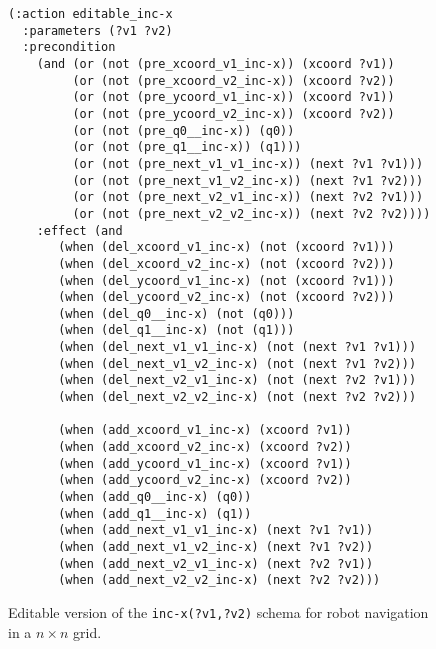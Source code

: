 \documentclass[letterpaper]{article} %
\begin{document}
\begin{figure}
  \begin{tiny}  
  \begin{verbatim}
(:action editable_inc-x
  :parameters (?v1 ?v2)
  :precondition
    (and (or (not (pre_xcoord_v1_inc-x)) (xcoord ?v1))
         (or (not (pre_xcoord_v2_inc-x)) (xcoord ?v2))
         (or (not (pre_ycoord_v1_inc-x)) (xcoord ?v1))                       
         (or (not (pre_ycoord_v2_inc-x)) (xcoord ?v2))
         (or (not (pre_q0__inc-x)) (q0))
         (or (not (pre_q1__inc-x)) (q1)))
         (or (not (pre_next_v1_v1_inc-x)) (next ?v1 ?v1)))
         (or (not (pre_next_v1_v2_inc-x)) (next ?v1 ?v2)))
         (or (not (pre_next_v2_v1_inc-x)) (next ?v2 ?v1)))
         (or (not (pre_next_v2_v2_inc-x)) (next ?v2 ?v2))))
    :effect (and
       (when (del_xcoord_v1_inc-x) (not (xcoord ?v1)))
       (when (del_xcoord_v2_inc-x) (not (xcoord ?v2)))
       (when (del_ycoord_v1_inc-x) (not (xcoord ?v1)))
       (when (del_ycoord_v2_inc-x) (not (xcoord ?v2)))
       (when (del_q0__inc-x) (not (q0)))
       (when (del_q1__inc-x) (not (q1)))
       (when (del_next_v1_v1_inc-x) (not (next ?v1 ?v1)))
       (when (del_next_v1_v2_inc-x) (not (next ?v1 ?v2)))
       (when (del_next_v2_v1_inc-x) (not (next ?v2 ?v1)))
       (when (del_next_v2_v2_inc-x) (not (next ?v2 ?v2)))
       
       (when (add_xcoord_v1_inc-x) (xcoord ?v1))
       (when (add_xcoord_v2_inc-x) (xcoord ?v2))
       (when (add_ycoord_v1_inc-x) (xcoord ?v1))
       (when (add_ycoord_v2_inc-x) (xcoord ?v2))
       (when (add_q0__inc-x) (q0))
       (when (add_q1__inc-x) (q1))
       (when (add_next_v1_v1_inc-x) (next ?v1 ?v1))
       (when (add_next_v1_v2_inc-x) (next ?v1 ?v2))
       (when (add_next_v2_v1_inc-x) (next ?v2 ?v1))
       (when (add_next_v2_v2_inc-x) (next ?v2 ?v2)))
  \end{verbatim}           
  \end{tiny}  
 \caption{\small Editable version of the {\tt\small inc-x(?v1,?v2)} schema for robot navigation in a $n\times n$ grid.}
\label{fig:editable}
\end{figure}
\end{document}
